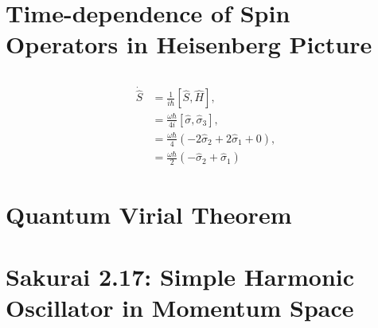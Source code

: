 \documentclass[
a4paper,
10pt,
twoside,
]{article}
\begin{document}
\titleinf
\maketitle
\startmcols

\section{Time-dependence of Spin Operators in Heisenberg Picture}
\subsection{} %
\begin{align}
	\dot{\hat S} &= \frac{1}{i\hbar} [\hat S, \hat H],\\
	&= \frac{\omega \hbar}{4i} [\hat\sigma, \hat\sigma_3],\\
	&= \frac{\omega \hbar}{4} \left( -2\hat\sigma_2 + 2\hat\sigma_1 + 0 \right),\\
	&= \frac{\omega \hbar}{2} \left( -\hat\sigma_2 + \hat\sigma_1 \right)
\end{align}

\subsection{} %
\subsection{} %

\section{Quantum Virial Theorem}
\subsection{} %
\subsection{} %
\subsection{} %

\section{Sakurai 2.17: Simple Harmonic Oscillator in Momentum Space}
\subsection{} %
\end{document}
